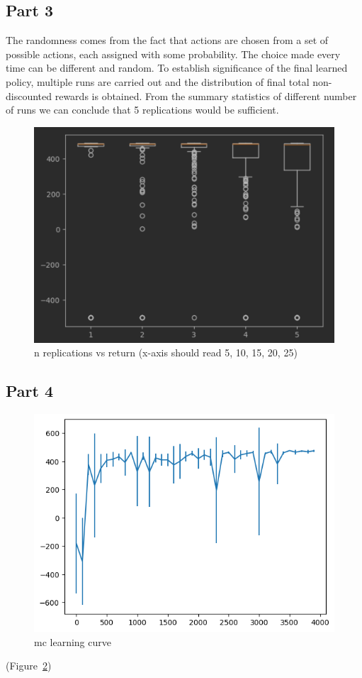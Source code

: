 \documentclass{article}
\begin{document}
    \subsection{Part 3}\label{subsec:question-2-3}
    The randomness comes from the fact that actions are chosen from a set of possible actions, each assigned with some probability.
    The choice made every time can be different and random.
    To establish significance of the final learned policy, multiple runs are carried out and the distribution of final total non-discounted rewards is obtained.
    From the summary statistics of different number of runs we can conclude that 5 replications would be sufficient.
    \begin{figure}[h]
        \includegraphics[width=0.9\linewidth]{images/n_replications_vs_reward_mc}
        \caption{n replications vs return (x-axis should read 5, 10, 15, 20, 25)}\label{fig:mc_replication_reward}
    \end{figure}

    \subsection{Part 4}\label{subsec:question-2-4}
    \begin{figure}[h]
        \includegraphics[width=0.9\linewidth]{images/mc_learning_curve}
        \caption{mc learning curve}\label{fig:mc_learning_curve}
    \end{figure}
    (Figure~\ref{fig:mc_learning_curve})
\end{document}

